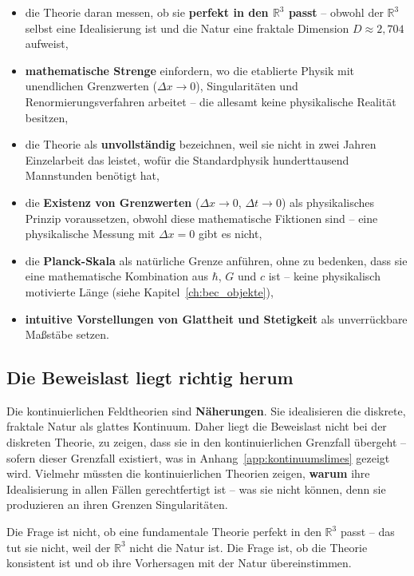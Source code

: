 \begin{itemize}
    \item die Theorie daran messen, ob sie \textbf{perfekt in den \( \mathbb{R}^3 \) passt} – obwohl der \( \mathbb{R}^3 \) selbst eine Idealisierung ist und die Natur eine fraktale Dimension \( D \approx 2{,}704 \) aufweist,
    \item \textbf{mathematische Strenge} einfordern, wo die etablierte Physik mit unendlichen Grenzwerten (\( \Delta x \to 0 \)), Singularitäten und Renormierungsverfahren arbeitet – die allesamt keine physikalische Realität besitzen,
    \item die Theorie als \textbf{unvollständig} bezeichnen, weil sie nicht in zwei Jahren Einzelarbeit das leistet, wofür die Standardphysik hunderttausend Mannstunden benötigt hat,
    \item die \textbf{Existenz von Grenzwerten} (\( \Delta x \to 0 \), \( \Delta t \to 0 \)) als physikalisches Prinzip voraussetzen, obwohl diese mathematische Fiktionen sind – eine physikalische Messung mit \( \Delta x = 0 \) gibt es nicht,
    \item die \textbf{Planck-Skala} als natürliche Grenze anführen, ohne zu bedenken, dass sie eine mathematische Kombination aus \( \hbar \), \( G \) und \( c \) ist – keine physikalisch motivierte Länge (siehe Kapitel~\ref{ch:bec_objekte}),
    \item \textbf{intuitive Vorstellungen von Glattheit und Stetigkeit} als unverrückbare Maßstäbe setzen.
\end{itemize}

\subsection{Die Beweislast liegt richtig herum}
\label{sub:beweislast}

Die kontinuierlichen Feldtheorien sind \textbf{Näherungen}. Sie idealisieren die diskrete, fraktale Natur als glattes Kontinuum. Daher liegt die Beweislast nicht bei der diskreten Theorie, zu zeigen, dass sie in den kontinuierlichen Grenzfall übergeht – sofern dieser Grenzfall existiert, was in Anhang~\ref{app:kontinuumslimes} gezeigt wird. Vielmehr müssten die kontinuierlichen Theorien zeigen, \textbf{warum} ihre Idealisierung in allen Fällen gerechtfertigt ist – was sie nicht können, denn sie produzieren an ihren Grenzen Singularitäten.

Die Frage ist nicht, ob eine fundamentale Theorie perfekt in den \( \mathbb{R}^3 \) passt – das tut sie nicht, weil der \( \mathbb{R}^3 \) nicht die Natur ist. Die Frage ist, ob die Theorie konsistent ist und ob ihre Vorhersagen mit der Natur übereinstimmen.

